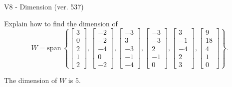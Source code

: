 \begin{exercise}
  \begin{exerciseTitle}V8 - Dimension (ver. 537)\end{exerciseTitle}
  \begin{exerciseStatement}
    Explain how to find the dimension of 
\[W=\mathrm{span}\ \left\{\left[\begin{array}{r}
3 \\
0 \\
2 \\
1 \\
2
\end{array}\right] , \left[\begin{array}{r}
-2 \\
-2 \\
-4 \\
0 \\
-2
\end{array}\right] , \left[\begin{array}{r}
-3 \\
3 \\
-3 \\
-1 \\
-4
\end{array}\right] , \left[\begin{array}{r}
-3 \\
-3 \\
2 \\
-1 \\
0
\end{array}\right] , \left[\begin{array}{r}
3 \\
-1 \\
-4 \\
2 \\
3
\end{array}\right] , \left[\begin{array}{r}
9 \\
18 \\
4 \\
1 \\
0
\end{array}\right]\right\}.\]



  \end{exerciseStatement}
  \begin{exerciseAnswer}
   The dimension of \(W\) is  \(5\).
  


  \end{exerciseAnswer}
\end{exercise}